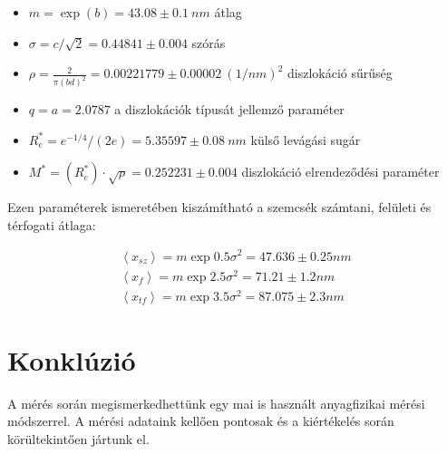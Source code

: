 \documentclass[12pt]{article}
\theoremstyle{plain}
\begin{document}
\begin{itemize}
	\item $m = \exp(b) = 43.08\pm0.1~nm$ átlag
	\item $\sigma = c/\sqrt{2} = 0.44841\pm0.004$ szórás
	\item $\rho = \frac{2}{\pi (bd)^2}=0.00221779 \pm 0.00002~(1/nm)^2$ diszlokáció sűrűség
	\item $q  = a = 2.0787$ a diszlokációk típusát jellemző paraméter
	\item $R_e^*=e^{-1/4}/(2e)=5.35597\pm0.08~nm$ külső levágási sugár
	\item $M^*=(R_e^*)\cdot\sqrt{\rho}=0.252231\pm0.004$ diszlokáció elrendeződési paraméter
\end{itemize}

\vspace{.2cm}

\par Ezen paraméterek ismeretében kiszámítható a szemcsék számtani, felületi és térfogati átlaga:

\begin{eqnarray}
	\left<x_{sz}\right> = m\exp{0.5\sigma^2} = 47.636 \pm 0.25 nm\\
	\left<x_{f}\right> = m\exp{2.5\sigma^2} = 71.21 \pm 1.2nm\\
	\left<x_{tf}\right> = m\exp{3.5\sigma^2} = 87.075 \pm 2.3nm
\end{eqnarray}

\vspace{.2cm}

\section{Konklúzió}

\vspace{.2cm}

\par A mérés során megismerkedhettünk egy mai is használt anyagfizikai
mérési módszerrel. A mérési adataink kellően pontosak és a kiértékelés során
körültekintően jártunk el.

\newpage



\end{document}
